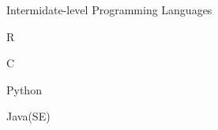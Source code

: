 

\begin{cventries}

  \cventry
    {Intermidate-level} %
    {Programming Languages} %
    {} %
    {} %
    {
      \begin{cvitems} %
        \item {R}
        \item {C}
        \item {Python}
        \item {Java(SE)}
      \end{cvitems}
    }

\end{cventries}
